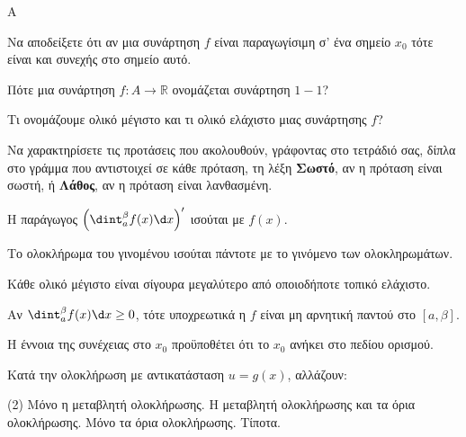 \begin{thema}{A}
\begin{erwthma}
    \item Να αποδείξετε ότι αν μια συνάρτηση $f$ είναι παραγωγίσιμη σ’ ένα σημείο {$ x_0 $} τότε είναι και συνεχής στο σημείο αυτό.
    \item Πότε μια συνάρτηση $f:A\to\mathbb{R}$ ονομάζεται συνάρτηση $1-1$?
    \item Τι ονομάζουμε ολικό μέγιστο και τι ολικό ελάχιστο μιας συνάρτησης $f$?
    \item Να χαρακτηρίσετε τις προτάσεις που ακολουθούν, γράφοντας στο τετράδιό σας, δίπλα στο γράμμα που αντιστοιχεί σε κάθε πρόταση, τη λέξη \textbf{Σωστό}, αν η πρόταση είναι σωστή, ή \textbf{Λάθος}, αν η πρόταση είναι λανθασμένη.
    \begin{alist}
        \item Η παράγωγος $\left(\dint_a^\beta f(x) \d x \right)'$ ισούται με $ f(x)$.
        \item Το ολοκλήρωμα του γινομένου ισούται πάντοτε με το γινόμενο των ολοκληρωμάτων.
        \item Κάθε ολικό μέγιστο είναι σίγουρα μεγαλύτερο από οποιοδήποτε τοπικό ελάχιστο.
        \item Αν $\dint_a^\beta f(x) \d x \ge 0$, τότε υποχρεωτικά η $f$ είναι μη αρνητική παντού στο $[a, \beta]$.
        \item Η έννοια της συνέχειας στο $x_0$ προϋποθέτει ότι το $x_0$ ανήκει στο πεδίου ορισμού.
    \end{alist}
    \item Κατά την ολοκλήρωση με αντικατάσταση $u = g(x)$, αλλάζουν:
    \begin{tasks}[label=\let\textdexiakeraia\relax\alph*.](2)
        \task Μόνο η μεταβλητή ολοκλήρωσης.
        \task H μεταβλητή ολοκλήρωσης και τα όρια ολοκλήρωσης.
        \task Μόνο τα όρια ολοκλήρωσης.
        \task Τίποτα.
    \end{tasks}
\end{erwthma}
\end{thema}
